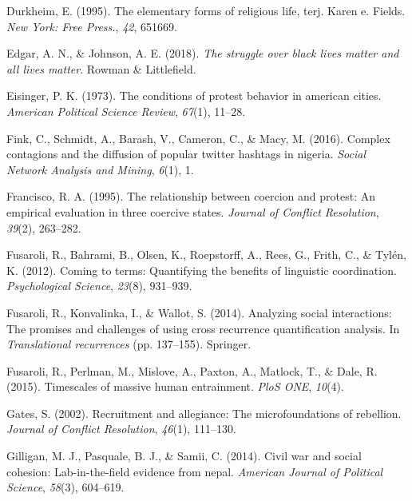 \documentclass[english,man]{apa6}
\begin{document}
\leavevmode\hypertarget{ref-durkheim1995elementary}{}%
Durkheim, E. (1995). The elementary forms of religious life, terj. Karen e. Fields. \emph{New York: Free Press.}, \emph{42}, 651669.

\leavevmode\hypertarget{ref-edgar2018struggle}{}%
Edgar, A. N., \& Johnson, A. E. (2018). \emph{The struggle over black lives matter and all lives matter}. Rowman \& Littlefield.

\leavevmode\hypertarget{ref-eisinger1973conditions}{}%
Eisinger, P. K. (1973). The conditions of protest behavior in american cities. \emph{American Political Science Review}, \emph{67}(1), 11--28.

\leavevmode\hypertarget{ref-fink2016complex}{}%
Fink, C., Schmidt, A., Barash, V., Cameron, C., \& Macy, M. (2016). Complex contagions and the diffusion of popular twitter hashtags in nigeria. \emph{Social Network Analysis and Mining}, \emph{6}(1), 1.

\leavevmode\hypertarget{ref-francisco1995relationship}{}%
Francisco, R. A. (1995). The relationship between coercion and protest: An empirical evaluation in three coercive states. \emph{Journal of Conflict Resolution}, \emph{39}(2), 263--282.

\leavevmode\hypertarget{ref-fusaroli2012coming}{}%
Fusaroli, R., Bahrami, B., Olsen, K., Roepstorff, A., Rees, G., Frith, C., \& Tylén, K. (2012). Coming to terms: Quantifying the benefits of linguistic coordination. \emph{Psychological Science}, \emph{23}(8), 931--939.

\leavevmode\hypertarget{ref-fusaroli2014analyzing}{}%
Fusaroli, R., Konvalinka, I., \& Wallot, S. (2014). Analyzing social interactions: The promises and challenges of using cross recurrence quantification analysis. In \emph{Translational recurrences} (pp. 137--155). Springer.

\leavevmode\hypertarget{ref-fusaroli2015timescales}{}%
Fusaroli, R., Perlman, M., Mislove, A., Paxton, A., Matlock, T., \& Dale, R. (2015). Timescales of massive human entrainment. \emph{PloS ONE}, \emph{10}(4).

\leavevmode\hypertarget{ref-gates2002recruitment}{}%
Gates, S. (2002). Recruitment and allegiance: The microfoundations of rebellion. \emph{Journal of Conflict Resolution}, \emph{46}(1), 111--130.

\leavevmode\hypertarget{ref-gilligan2014civil}{}%
Gilligan, M. J., Pasquale, B. J., \& Samii, C. (2014). Civil war and social cohesion: Lab-in-the-field evidence from nepal. \emph{American Journal of Political Science}, \emph{58}(3), 604--619.
\end{document}

